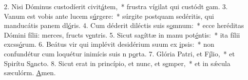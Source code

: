 2. Nisi Dóminus custodíerit civit\uline{á}tem,~* frustra vígilat qui custódt \uline{e}am.
3. Vanum est vobis ante lucem s\uline{ú}rgere:~* súrgite postquam sedéritis, qui manducátis panem dl\uline{ó}ris.
4. Cum déderit diléctis suis s\uline{o}mnum:~* ecce heréditas Dómini fílii: merces, fructs v\uline{e}ntris.
5. Sicut sagíttæ in manu pot\uline{é}ntis:~* ita fílii excss\uline{ó}rum.
6. Beátus vir qui implévit desidérium suum ex \uline{i}psis:~* non confundétur cum loquétur inimícis suis n p\uline{o}rta.
7. Glória Patri, et F\uline{í}lio,~* et Spirítu S\uline{a}ncto.
8. Sicut erat in princípio, et nunc, et s\uline{e}mper,~* et in sǽcula sæculórm. \uline{A}men.
